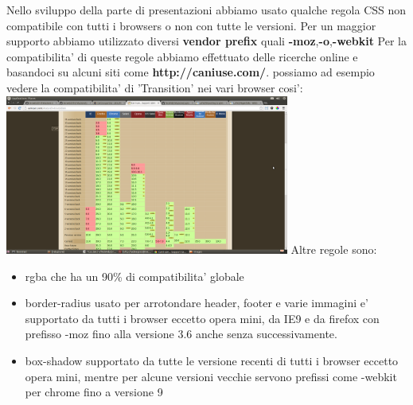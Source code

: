 Nello sviluppo della parte di presentazioni abbiamo usato qualche regola CSS non compatibile con tutti i browsers o non con tutte le versioni.
Per un maggior supporto abbiamo utilizzato diversi \textbf{vendor prefix} quali \textbf{-moz},\textbf{-o},\textbf{-webkit}
Per la compatibilita' di queste regole abbiamo effettuato delle ricerche online e basandoci su alcuni siti come \textbf{http://caniuse.com/}.
possiamo ad esempio vedere la compatibilita' di 'Transition' nei vari browser cosi': \newline \newline
 \includegraphics[width=0.7\textwidth]{images/caniuse1.png} \newline
Altre regole sono:
\begin{itemize}
	\item rgba che ha un 90\% di compatibilita' globale
	\item border-radius usato per arrotondare header, footer e varie immagini e' supportato da tutti i browser eccetto opera mini, da IE9 e da firefox con prefisso -moz fino alla versione 3.6 anche senza successivamente.
	\item box-shadow supportato da tutte le versione recenti di tutti i browser eccetto opera mini, mentre per alcune versioni vecchie servono prefissi come -webkit per chrome fino a versione 9
\end{itemize}

